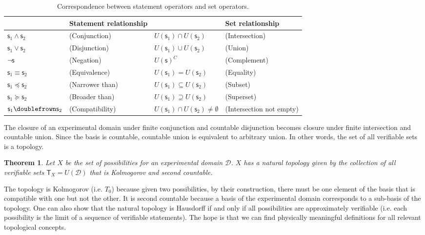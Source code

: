 \documentclass[letterpaper]{article}
\theoremstyle{plain}%
\newtheorem{thrm}{Theorem}[section]
\theoremstyle{definition}
\theoremstyle{remark}
\numberwithin{equation}{section}
\def\comp{\doublefrown}
\def\narrower{\preccurlyeq}
\def\broader{\succcurlyeq}
\def\AND{\wedge}
\def\OR{\vee}
\def\NOT{\neg}
\newcommand{\stmt}[1][s] {\mathsf{#1}}
\newcommand{\edomain}[1][D] {\mathcal{#1}}
\begin{document}
\begin{table}[h]
	\centering
	\begin{tabular}{p{} p{} p{} p{}}
		& Statement relationship & & Set relationship  \\ 
		\hline 
		$\stmt_1 \AND \stmt_2$ & (Conjunction) & $U(\stmt_1) \cap U(\stmt_2)$ & (Intersection) \\ 
		$\stmt_1 \OR \stmt_2$ & (Disjunction) & $U(\stmt_1) \cup U(\stmt_2)$ & (Union) \\ 
		$\NOT \stmt$ & (Negation) & $U(\stmt)^C$ & (Complement) \\ 
		$\stmt_1 \equiv \stmt_2$ & (Equivalence) & $U(\stmt_1) = U(\stmt_2)$ & (Equality) \\ 
		$\stmt_1 \narrower \stmt_2$ & (Narrower than) & $U(\stmt_1) \subseteq U(\stmt_2)$ & (Subset) \\ 
		$\stmt_1 \broader \stmt_2$ & (Broader than) & $U(\stmt_1) \supseteq U(\stmt_2)$ & (Superset) \\ 
		$\stmt_1 \comp \stmt_2$ & (Compatibility) & $U(\stmt_1) \cap U(\stmt_2) \neq \emptyset$ & (Intersection not empty)
	\end{tabular} 
	\caption{Correspondence between statement operators and set operators.}
\end{table}

The closure of an experimental domain under finite conjunction and countable disjunction becomes closure under finite intersection and countable union. Since the basis is countable, countable union is equivalent to arbitrary union. In other words, the set of all verifiable sets is a topology.

\begin{thrm}
	Let $X$ be the set of possibilities for an experimental domain $\edomain$. $X$ has a natural topology given by the collection of all verifiable sets $\mathsf{T}_X=U(\edomain)$ that is Kolmogorov and second countable.
\end{thrm}

The topology is Kolmogorov (i.e. $T_0$) because given two possibilities, by their construction, there must be one element of the basis that is compatible with one but not the other. It is second countable because a basis of the experimental domain corresponds to a sub-basis of the topology. One can also show that the natural topology is Hausdorff if and only if all possibilities are approximately verifiable (i.e. each possibility is the limit of a sequence of verifiable statements). The hope is that we can find physically meaningful definitions for all relevant topological concepts.
\end{document}
